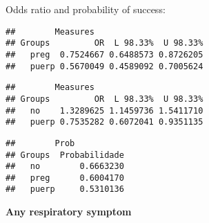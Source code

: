 \documentclass[
]{article}
\newenvironment{Shaded}{\begin{snugshade}}{\end{snugshade}}
\newcommand{\CommentTok}[1]{\textcolor[rgb]{0.56,0.35,0.01}{\textit{#1}}}
\newcommand{\KeywordTok}[1]{\textcolor[rgb]{0.13,0.29,0.53}{\textbf{#1}}}
\newcommand{\NormalTok}[1]{#1}
\newcommand{\OperatorTok}[1]{\textcolor[rgb]{0.81,0.36,0.00}{\textbf{#1}}}
\begin{document}
Odds ratio and probability of success:

\begin{Shaded}
\end{Shaded}

\begin{verbatim}
##        Measures
## Groups         OR  L 98.33%  U 98.33%
##   preg  0.7524667 0.6488573 0.8726205
##   puerp 0.5670049 0.4589092 0.7005624
\end{verbatim}

\begin{Shaded}
\end{Shaded}

\begin{verbatim}
##        Measures
## Groups         OR  L 98.33%  U 98.33%
##   no    1.3289625 1.1459736 1.5411710
##   puerp 0.7535282 0.6072041 0.9351135
\end{verbatim}

\begin{Shaded}
\end{Shaded}

\begin{verbatim}
##        Prob
## Groups  Probabilidade
##   no        0.6663230
##   preg      0.6004170
##   puerp     0.5310136
\end{verbatim}

\textbf{Any respiratory symptom}
\end{document}
